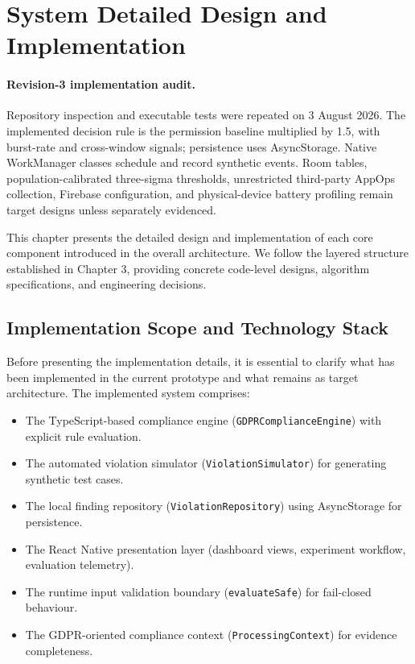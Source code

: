 \newpage
\section{System Detailed Design and Implementation}

\paragraph{Revision-3 implementation audit.} Repository inspection and executable tests were repeated on 3 August 2026. The implemented decision rule is the permission baseline multiplied by 1.5, with burst-rate and cross-window signals; persistence uses AsyncStorage. Native WorkManager classes schedule and record synthetic events. Room tables, population-calibrated three-sigma thresholds, unrestricted third-party AppOps collection, Firebase configuration, and physical-device battery profiling remain target designs unless separately evidenced.

This chapter presents the detailed design and implementation of each core component introduced in the overall architecture. We follow the layered structure established in Chapter 3, providing concrete code-level designs, algorithm specifications, and engineering decisions.

\subsection{Implementation Scope and Technology Stack}

Before presenting the implementation details, it is essential to clarify what has been implemented in the current prototype and what remains as target architecture. The implemented system comprises:

\begin{itemize}
\item The TypeScript-based compliance engine (\texttt{GDPRComplianceEngine}) with explicit rule evaluation.
\item The automated violation simulator (\texttt{ViolationSimulator}) for generating synthetic test cases.
\item The local finding repository (\texttt{ViolationRepository}) using AsyncStorage for persistence.
\item The React Native presentation layer (dashboard views, experiment workflow, evaluation telemetry).
\item The runtime input validation boundary (\texttt{evaluateSafe}) for fail-closed behaviour.
\item The GDPR-oriented compliance context (\texttt{ProcessingContext}) for evidence completeness.
\end{itemize}

